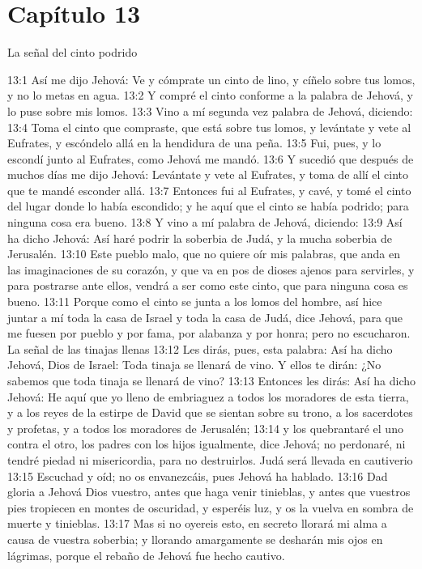 \section*{Capítulo 13 }
La señal del cinto podrido 
 
13:1 Así me dijo Jehová: Ve y cómprate un cinto de lino, y cíñelo sobre tus lomos, y no lo metas en agua. 
13:2 Y compré el cinto conforme a la palabra de Jehová, y lo puse sobre mis lomos. 
13:3 Vino a mí segunda vez palabra de Jehová, diciendo: 
13:4 Toma el cinto que compraste, que está sobre tus lomos, y levántate y vete al Eufrates, y escóndelo allá en la hendidura de una peña. 
13:5 Fui, pues, y lo escondí junto al Eufrates, como Jehová me mandó. 
13:6 Y sucedió que después de muchos días me dijo Jehová: Levántate y vete al Eufrates, y toma de allí el cinto que te mandé esconder allá. 
13:7 Entonces fui al Eufrates, y cavé, y tomé el cinto del lugar donde lo había escondido; y he aquí que el cinto se había podrido; para ninguna cosa era bueno. 
13:8 Y vino a mí palabra de Jehová, diciendo: 
13:9 Así ha dicho Jehová: Así haré podrir la soberbia de Judá, y la mucha soberbia de Jerusalén. 
13:10 Este pueblo malo, que no quiere oír mis palabras, que anda en las imaginaciones de su corazón, y que va en pos de dioses ajenos para servirles, y para postrarse ante ellos, vendrá a ser como este cinto, que para ninguna cosa es bueno. 
13:11 Porque como el cinto se junta a los lomos del hombre, así hice juntar a mí toda la casa de Israel y toda la casa de Judá, dice Jehová, para que me fuesen por pueblo y por fama, por alabanza y por honra; pero no escucharon. 
La señal de las tinajas llenas 
13:12 Les dirás, pues, esta palabra: Así ha dicho Jehová, Dios de Israel: Toda tinaja se llenará de vino. Y ellos te dirán: ¿No sabemos que toda tinaja se llenará de vino? 
13:13 Entonces les dirás: Así ha dicho Jehová: He aquí que yo lleno de embriaguez a todos los moradores de esta tierra, y a los reyes de la estirpe de David que se sientan sobre su trono, a los sacerdotes y profetas, y a todos los moradores de Jerusalén; 
13:14 y los quebrantaré el uno contra el otro, los padres con los hijos igualmente, dice Jehová; no perdonaré, ni tendré piedad ni misericordia, para no destruirlos. 
Judá será llevada en cautiverio 
13:15 Escuchad y oíd; no os envanezcáis, pues Jehová ha hablado. 
13:16 Dad gloria a Jehová Dios vuestro, antes que haga venir tinieblas, y antes que vuestros pies tropiecen en montes de oscuridad, y esperéis luz, y os la vuelva en sombra de muerte y tinieblas. 
13:17 Mas si no oyereis esto, en secreto llorará mi alma a causa de vuestra soberbia; y llorando amargamente se desharán mis ojos en lágrimas, porque el rebaño de Jehová fue hecho cautivo. 
